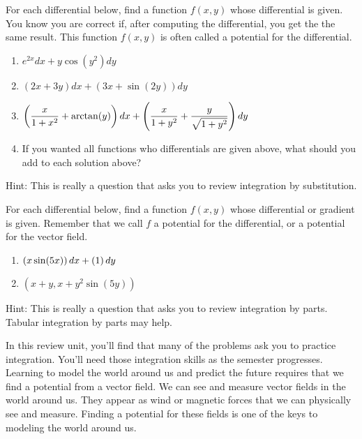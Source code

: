 \begin{problem}
For each differential below, find a function $f(x,y)$ whose differential is given. You know you are correct if, after computing the differential, you get the the same result. This function $f(x,y)$ is often called a potential for the differential. 
\begin{enumerate}
 \item $e^{2x}dx + y\cos (y^2)dy$
 \item $(2x+3y)dx+(3x+\sin(2y))dy$
 \item $\displaystyle\left(\frac{x}{1+x^2}+\arctan(y)\right)dx + \left(\frac{x}{1+y^2}+\frac{y}{\sqrt{1+y^2}}\right)dy$
\item If you wanted all functions who differentials are given above, what should you add to each solution above?
\end{enumerate}
 Hint: This is really a question that asks you to review integration by substitution. 
\end{problem}


\begin{problem}
 For each differential below, find a function $f(x,y)$ whose differential or gradient is given. Remember that we call $f$ a potential for the differential, or a potential for the vector field. 
\begin{enumerate}
 \item $\displaystyle\left(x\sin(5x)\right)dx + \left(1\right)dy$
 \item $\left(x+y,x+y^2\sin(5y)\right)$
\end{enumerate}
%
Hint: This is really a question that asks you to review integration by parts. Tabular integration by parts may help.
\end{problem}

In this review unit, you'll find that many of the problems ask you to practice integration.  You'll need those integration skills as the semester progresses. Learning to model the world around us and predict the future requires that we find a potential from a vector field. We can see and measure vector fields in the world around us. They appear as wind or magnetic forces that we can physically see and measure. Finding a potential for these fields is one of the keys to modeling the world around us.

\subsection*{\ideaD}

